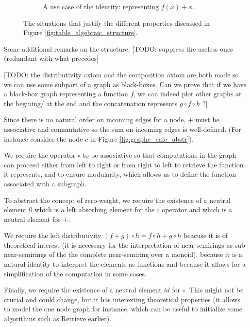 \documentclass[11pt,a4paper]{article}
\begin{document}
\begin{figure}
\begin{subfigure}{\textwidth}
		\caption{A use case of the identity: representing $f(x) + x$.}
	\end{subfigure}
\caption{The situations that justify the different properties discussed in Figure \ref{fig:table_algebraic_structure}.}
\label{fig:drawings_algebraic_struct}
\end{figure}

Some additional remarks on the structure: [TODO: suppress the useless ones (redundant with what precedes]

[TODO: the distributivity axiom and the composition axiom are both made so we can use some subpart of a graph as black-boxes. Can we prove that if we have a black-box graph representing a function $f$, we can indeed plot other graphs at the begining/ at the end and the concatenation represents $g\circ  f \circ h$ ?]


	Since there is no natural order on incoming edges for a node, $+$ must be associative and commutative so the sum on incoming edges is well-defined. (For instance consider the node $c$ in Figure \ref{fig:graphe_calc_abstr}).

	We require the operator $\circ$ to be associative so that computations in the graph can proceed either from left to right or from right to left to retrieve the function it represents, and to ensure modularity, which allows us to define the function associated with a subgraph.

	To abstract the concept of zero-weight, we require the existence of a neutral element $0$ which is a left absorbing element for the $\circ$ operator and which is a neutral element for $+$.

	We require the left distributivity $(f+g) \circ h = f \circ h + g \circ h$ beacuse it is of theoretical interest (it is necessary for the interpretation of near-semirings as sub-near-semirings of the the complete near-semiring over a monoid), because it is a natural identity to interpret the elements as functions and because it allows for a simplification of the computation in some cases.

	Finally, we require the existence of a neutral element $id$ for $\circ$. This might not be crucial and could change, but it has interexting theoretical properties (it allows to model the one node graph for instance, which can be useful to initialize some algorithms such as Retrieve earlier). 
	\\
\end{document}
